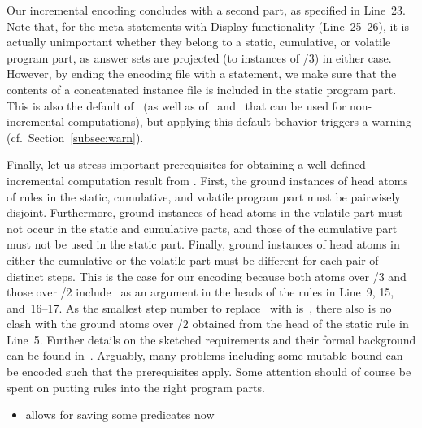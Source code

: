 Our incremental encoding concludes with a second  part,
as specified in Line~23.
Note that, for the meta-statements with Display functionality (Line~25--26),
it is actually unimportant whether they belong to a static, cumulative, or
volatile program part, as answer sets are projected
(to instances of /$3$) in either case.
However, by ending the encoding file with a  statement,
we make sure that the contents of a concatenated instance file
is included in the static program part.
This is also the default of \iclingo\
(as well as of \gringo\ and \clingo\ that can be used for non-incremental computations),
but applying this default behavior triggers a warning (cf.\ Section~\ref{subsec:warn}).%

Finally, let us stress important prerequisites for obtaining
a well-defined incremental computation result from \iclingo.
First, the ground instances of head atoms of rules in the
static, cumulative, and volatile program part must be pairwisely disjoint.
Furthermore, ground instances of head atoms in the volatile part
must not occur in the static and cumulative parts,
and those of the cumulative part must not be used in the static part.
Finally, ground instances of head atoms in either the cumulative or the volatile part
must be different for each pair of distinct steps.
This is the case for our encoding because both atoms over \pred{move}/$3$
and those over \pred{holds}/$2$ include~ as an argument in the
heads of the rules in Line~9, 15, and~16--17.
As the smallest step number to replace~\const{t} with is~\const{1},
there also is no clash with the ground atoms over /$2$
obtained from the head of the static rule in Line~5.
Further details on the sketched requirements and their formal background can
be found in~\cite{gekakaosscth08a}.
Arguably, many problems including some mutable bound can be encoded
such that the prerequisites apply.
Some attention should of course be spent on
putting rules into the right program parts.

\begin{newstuff}
	\begin{itemize}
		\item allows for saving some predicates now
	\end{itemize}
\end{newstuff}

